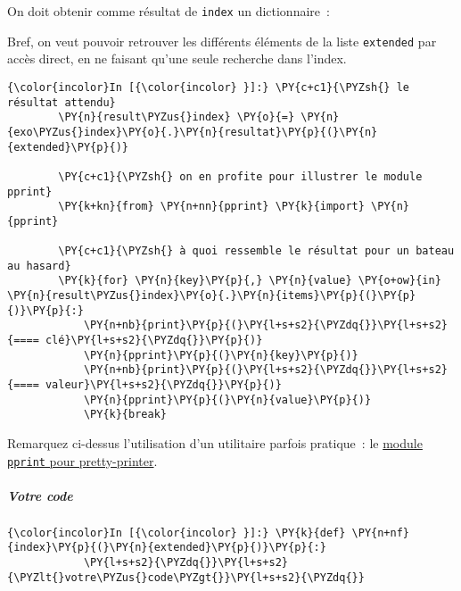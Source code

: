 On doit obtenir comme résultat de \texttt{index} un dictionnaire~:

\begin{Shaded}
\begin{Highlighting}[]
\NormalTok{\{}
\OperatorTok{->}
\NormalTok{\}}
\end{Highlighting}
\end{Shaded}

Bref, on veut pouvoir retrouver les différents éléments de la liste
\texttt{extended} par accès direct, en ne faisant qu'une seule recherche
dans l'index.

    \begin{Verbatim}[commandchars=\\\{\}]
{\color{incolor}In [{\color{incolor} }]:} \PY{c+c1}{\PYZsh{} le résultat attendu}
        \PY{n}{result\PYZus{}index} \PY{o}{=} \PY{n}{exo\PYZus{}index}\PY{o}{.}\PY{n}{resultat}\PY{p}{(}\PY{n}{extended}\PY{p}{)}
        
        \PY{c+c1}{\PYZsh{} on en profite pour illustrer le module pprint}
        \PY{k+kn}{from} \PY{n+nn}{pprint} \PY{k}{import} \PY{n}{pprint}
        
        \PY{c+c1}{\PYZsh{} à quoi ressemble le résultat pour un bateau au hasard}
        \PY{k}{for} \PY{n}{key}\PY{p}{,} \PY{n}{value} \PY{o+ow}{in} \PY{n}{result\PYZus{}index}\PY{o}{.}\PY{n}{items}\PY{p}{(}\PY{p}{)}\PY{p}{:}
            \PY{n+nb}{print}\PY{p}{(}\PY{l+s+s2}{\PYZdq{}}\PY{l+s+s2}{==== clé}\PY{l+s+s2}{\PYZdq{}}\PY{p}{)}
            \PY{n}{pprint}\PY{p}{(}\PY{n}{key}\PY{p}{)}
            \PY{n+nb}{print}\PY{p}{(}\PY{l+s+s2}{\PYZdq{}}\PY{l+s+s2}{==== valeur}\PY{l+s+s2}{\PYZdq{}}\PY{p}{)}
            \PY{n}{pprint}\PY{p}{(}\PY{n}{value}\PY{p}{)}
            \PY{k}{break}
\end{Verbatim}


    Remarquez ci-dessus l'utilisation d'un utilitaire parfois pratique~: le
\href{https://docs.python.org/3/library/pprint.html}{module
\texttt{pprint} pour pretty-printer}.

    \hypertarget{votre-code}{%
\subparagraph{Votre code}\label{votre-code}}

    \begin{Verbatim}[commandchars=\\\{\}]
{\color{incolor}In [{\color{incolor} }]:} \PY{k}{def} \PY{n+nf}{index}\PY{p}{(}\PY{n}{extended}\PY{p}{)}\PY{p}{:}
            \PY{l+s+s2}{\PYZdq{}}\PY{l+s+s2}{\PYZlt{}votre\PYZus{}code\PYZgt{}}\PY{l+s+s2}{\PYZdq{}}
\end{Verbatim}


